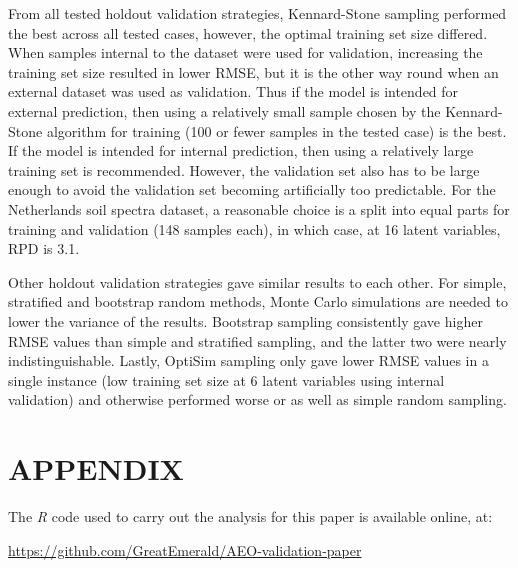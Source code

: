\documentclass{isprs}
\begin{document}
From all tested holdout validation strategies, Kennard-Stone sampling performed the best across all tested cases, however, the optimal training set size differed. When samples internal to the dataset were used for validation, increasing the training set size resulted in lower RMSE, but it is the other way round when an external dataset was used as validation. Thus if the model is intended for external prediction, then using a relatively small sample chosen by the Kennard-Stone algorithm for training (100 or fewer samples in the tested case) is the best. If the model is intended for internal prediction, then using a relatively large training set is recommended. However, the validation set also has to be large enough to avoid the validation set becoming artificially too predictable. For the Netherlands soil spectra dataset, a reasonable choice is a split into equal parts for training and validation (148 samples each), in which case, at 16 latent variables, RPD is 3.1.

Other holdout validation strategies gave similar results to each other. For simple, stratified and bootstrap random methods, Monte Carlo simulations are needed to lower the variance of the results. Bootstrap sampling consistently gave higher RMSE values than simple and stratified sampling, and the latter two were nearly indistinguishable. Lastly, OptiSim sampling only gave lower RMSE values in a single instance (low training set size at 6 latent variables using internal validation) and otherwise performed worse or as well as simple random sampling.

{%
	\begin{spacing}{0.9}%
		
	\end{spacing}
}

\section*{APPENDIX}\label{APPENDIX}

The \textit{R} code used to carry out the analysis for this paper is available online, at:

\url{https://github.com/GreatEmerald/AEO-validation-paper}
\end{document}
